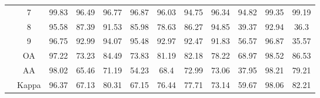 \begin{table}[htbp]
{\begin{tabular}{c c c c c c c c c c c c}
& 7 & 99.83 & 96.49 & 96.77 & 96.87 & 96.03 & 94.75 & 96.34 & 94.82 & 99.35 & 99.19 \\
& 8 & 95.58 & 87.39 & 91.53 & 85.98 & 78.63 & 86.27 & 94.85 & 39.37 & 92.94 & 36.3 \\
& 9 & 96.75 & 92.99 & 94.07 & 95.48 & 92.97 & 92.47 & 91.83 & 56.57 & 96.87 & 35.57 \\
& OA & 97.22 & 73.23 & 84.49 & 73.83 & 81.19 & 82.18 & 78.22 & 68.97 & 98.52 & 86.53 \\
& AA & 98.02 & 65.46 & 71.19 & 54.23 & 68.4 & 72.99 & 73.06 & 37.95 & 98.21 & 79.21 \\
& Kappa & 96.37 & 67.13 & 80.31 & 67.15 & 76.44 & 77.71 & 73.14 & 59.67 & 98.06 & 82.21 \\
\bottomrule
\end{tabular}
}
\end{table}

